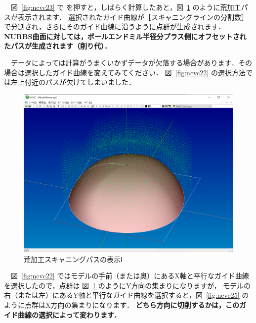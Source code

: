 　図~\ref{fig:ncvc23} で  を押すと，しばらく計算したあと，図~\ref{fig:ncvc24} のように荒加工パスが表示されます．
選択されたガイド曲線が［スキャニングラインの分割数］で分割され，さらにそのガイド曲線に沿うように点群が生成されます．
\textbf{NURBS曲面に対しては，ボールエンドミル半径分プラス側にオフセットされたパスが生成されます（削り代）．}

　データによっては計算がうまくいかずデータが欠落する場合があります．その場合は選択したガイド曲線を変えてみてください．
図~\ref{fig:ncvc22} の選択方法では左上付近のパスが欠けてしまいました．

\begin{figure}[H]
\centering
\includegraphics[scale=0.5]{No2/fig/fig24.png}
\caption{荒加工スキャニングパスの表示Ⅰ}
\label{fig:ncvc24}
\end{figure}

　図~\ref{fig:ncvc22} ではモデルの手前（または奥）にあるX軸と平行なガイド曲線を選択したので，点群は 図~\ref{fig:ncvc24} のようにY方向の集まりになりますが，
モデルの右（または左）にあるY軸と平行なガイド曲線を選択すると，図~\ref{fig:ncvc25} のように点群はX方向の集まりになります．
\textbf{どちら方向に切削するかは，このガイド曲線の選択によって変わります．}

